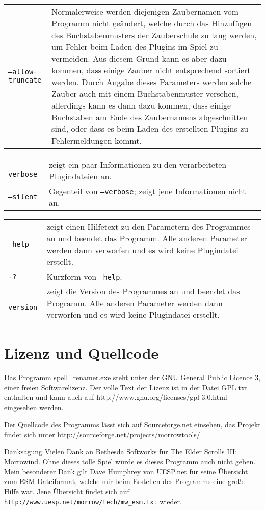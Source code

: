 \documentclass[12pt,oneside,a4paper]{article}
\begin{document}
\begin{tabular}{p{7cm} p{8cm}}
\texttt{--allow-truncate}         & Normalerweise werden diejenigen Zaubernamen vom Programm nicht ge\"{a}ndert, welche durch das Hinzuf\"{u}gen des Buchstabenmusters der Zauberschule zu lang werden, um Fehler beim Laden des Plugins im Spiel zu vermeiden. Aus diesem Grund kann es aber dazu kommen, dass einige Zauber nicht entsprechend sortiert werden. Durch Angabe dieses Parameters werden solche Zauber auch mit einem Buchstabenmuster versehen, allerdings kann es dann dazu kommen, dass einige Buchstaben am Ende des Zaubernamens abgeschnitten sind, oder dass es beim Laden des erstellten Plugins zu Fehlermeldungen kommt.\\
\end{tabular}
\newline
\begin{tabular}{p{7cm} p{8cm}}
\texttt{--verbose}                & zeigt ein paar Informationen zu den verarbeiteten Plugindateien an.\\
\texttt{--silent}                 & Gegenteil von \texttt{--verbose}; zeigt jene Informationen nicht an.\\
\end{tabular}
\newline
\begin{tabular}{p{7cm} p{8cm}}
\texttt{--help}                   & zeigt einen Hilfetext zu den Parametern des Programmes an und beendet das Programm. Alle anderen Parameter werden dann verworfen und es wird keine Plugindatei erstellt.\\
\texttt{-?}                       & Kurzform von \texttt{--help}.\\
\texttt{--version}                & zeigt die Version des Programmes an und beendet das Programm. Alle anderen Parameter werden dann verworfen und es wird keine Plugindatei erstellt.\\
\end{tabular}

\section{Lizenz und Quellcode}
Das Programm spell\_renamer.exe steht unter der GNU General Public Licence 3,
einer freien Softwarelizenz. Der volle Text der Lizenz ist in der Datei GPL.txt
enthalten und kann auch auf http://www.gnu.org/licenses\slash gpl-3.0.html eingesehen werden.

Der Quellcode des Programms l\"{a}sst sich auf Sourceforge.net einsehen, das Projekt
findet sich unter http://sourceforge.net/projects/morrowtools/

\begin{section}{Danksagung}
Vielen Dank an Bethesda Softworks f\"{u}r The Elder Scrolls III: Morrowind.
Ohne dieses tolle Spiel w\"{u}rde es dieses Programm auch nicht geben.\\
Mein besonderer Dank gilt Dave Humphrey von UESP.net f\"{u}r seine \"{U}bersicht
zum ESM-Dateiformat, welche mir beim Erstellen des Programms eine gro\ss{}e
Hilfe war. Jene \"{U}bersicht findet sich auf \texttt{http://www.uesp.net/morrow\slash tech/mw\_esm.txt}
wieder.
\end{section}
\end{document}
